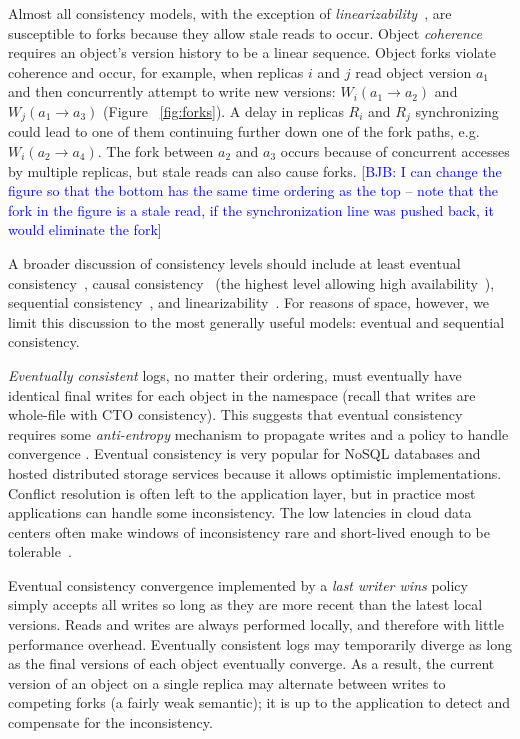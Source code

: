 \documentclass[10pt,conference,letterpaper]{IEEEtran}
\newcommand{\blue}[1]{{\textcolor{blue}{#1}}}
\newcommand{\bjb}[1]{[\blue{BJB: #1}]}
\begin{document}
Almost all consistency models, with the exception of
\textit{linearizability}~\cite{herlihy_linearizability:_1990}, are susceptible to forks
because they allow stale reads to occur.
Object \emph{coherence} requires an object's version history to be a linear sequence.
Object forks violate coherence and occur, for example, when replicas $i$ and $j$ read object version $a_1$
and then concurrently attempt to write new versions: $W_i(a_1 \rightarrow a_2)$ and
$W_j(a_1 \rightarrow a_3)$ (Figure ~\ref{fig:forks}).
A delay in replicas $R_i$ and $R_j$ synchronizing could lead to one of them continuing
further down one of the fork paths, e.g. $W_i(a_2 \rightarrow a_4)$.
The fork between $a_2$ and $a_3$ occurs because of concurrent accesses by multiple
replicas, but stale reads can also cause forks. \bjb{I can change the figure so that the bottom has the same time ordering as the top -- note that the fork in the figure is a stale read, if the synchronization line was pushed back, it would eliminate the fork}

A broader discussion of consistency levels should include at least eventual consistency~\cite{terry_managing_1995},
causal consistency~\cite{causal} (the highest level allowing high availability~\cite{bailis_bolt-causal_2013}),
sequential consistency~\cite{sequential-consistency}, and linearizability~\cite{herlihy_linearizability:_1990}.
For reasons of space, however, we limit this discussion to the most generally useful models:
eventual and sequential consistency.

\emph{Eventually consistent} logs, no matter their ordering, must eventually have identical final
writes for each object in the namespace (recall that writes are whole-file with CTO consistency).
This suggests that eventual consistency requires some \textit{anti-entropy} mechanism to
propagate writes and a policy to handle convergence \cite{terry_managing_1995}.
Eventual consistency is very popular for NoSQL databases and hosted distributed storage
services \cite{decandia_dynamo:_2007,lakshman_cassandra:_2010} because it allows
optimistic implementations.
Conflict resolution is often left to the application layer, but
in practice most applications can handle some inconsistency.
The low latencies in cloud data centers often make windows of
inconsistency rare and
short-lived enough to be tolerable~\cite{bailis_quantifying_2014}.

Eventual consistency convergence implemented by a \textit{last writer wins} policy simply accepts all
writes so long as they are more recent than the latest local versions.
Reads and writes are always performed locally, and therefore with little
performance overhead.
Eventually consistent logs may temporarily diverge as long as the final versions of each
object eventually converge.
As a result, the current version of an object on a single replica may alternate between writes to competing
forks (a fairly weak semantic); it is up to the application to detect and compensate for the
inconsistency.
\end{document}
